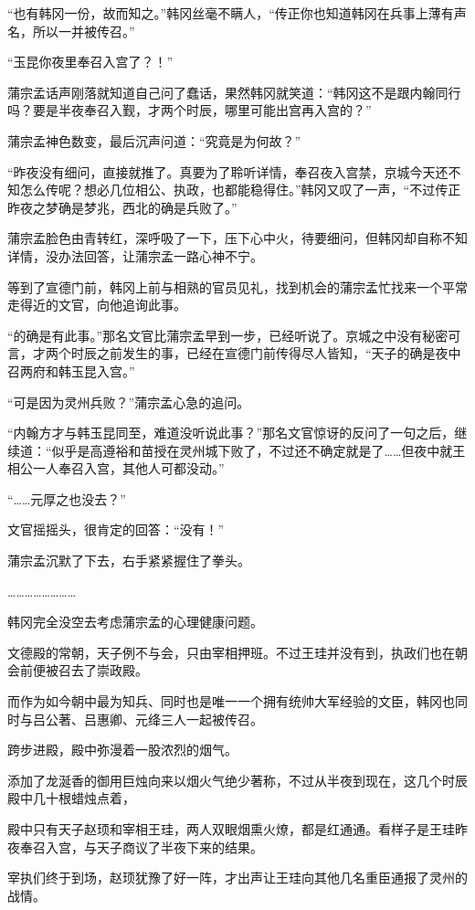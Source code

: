 “也有韩冈一份，故而知之。”韩冈丝毫不瞒人，“传正你也知道韩冈在兵事上薄有声名，所以一并被传召。”

“玉昆你夜里奉召入宫了？！”

蒲宗孟话声刚落就知道自己问了蠢话，果然韩冈就笑道：“韩冈这不是跟内翰同行吗？要是半夜奉召入觐，才两个时辰，哪里可能出宫再入宫的？”

蒲宗孟神色数变，最后沉声问道：“究竟是为何故？”

“昨夜没有细问，直接就推了。真要为了聆听详情，奉召夜入宫禁，京城今天还不知怎么传呢？想必几位相公、执政，也都能稳得住。”韩冈又叹了一声，“不过传正昨夜之梦确是梦兆，西北的确是兵败了。”

蒲宗孟脸色由青转红，深呼吸了一下，压下心中火，待要细问，但韩冈却自称不知详情，没办法回答，让蒲宗孟一路心神不宁。

等到了宣德门前，韩冈上前与相熟的官员见礼，找到机会的蒲宗孟忙找来一个平常走得近的文官，向他追询此事。

“的确是有此事。”那名文官比蒲宗孟早到一步，已经听说了。京城之中没有秘密可言，才两个时辰之前发生的事，已经在宣德门前传得尽人皆知，“天子的确是夜中召两府和韩玉昆入宫。”

“可是因为灵州兵败？”蒲宗孟心急的追问。

“内翰方才与韩玉昆同至，难道没听说此事？”那名文官惊讶的反问了一句之后，继续道：“似乎是高遵裕和苗授在灵州城下败了，不过还不确定就是了……但夜中就王相公一人奉召入宫，其他人可都没动。”

“……元厚之也没去？”

文官摇摇头，很肯定的回答：“没有！”

蒲宗孟沉默了下去，右手紧紧握住了拳头。

……………………

韩冈完全没空去考虑蒲宗孟的心理健康问题。

文德殿的常朝，天子例不与会，只由宰相押班。不过王珪并没有到，执政们也在朝会前便被召去了崇政殿。

而作为如今朝中最为知兵、同时也是唯一一个拥有统帅大军经验的文臣，韩冈也同时与吕公著、吕惠卿、元绛三人一起被传召。

跨步进殿，殿中弥漫着一股浓烈的烟气。

添加了龙涎香的御用巨烛向来以烟火气绝少著称，不过从半夜到现在，这几个时辰殿中几十根蜡烛点着，

殿中只有天子赵顼和宰相王珪，两人双眼烟熏火燎，都是红通通。看样子是王珪昨夜奉召入宫，与天子商议了半夜下来的结果。

宰执们终于到场，赵顼犹豫了好一阵，才出声让王珪向其他几名重臣通报了灵州的战情。


